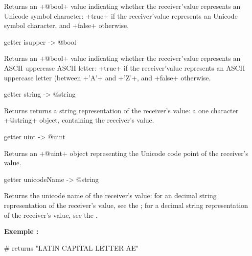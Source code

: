 Returns an \ggs+@bool+ value indicating whether the receiver'value represents an Unicode symbol character: \ggs+true+ if the receiver'value represents an Unicode symbol character, and \ggs+false+ otherwise.










\begin{galgas}
getter isupper -> @bool
\end{galgas}

Returns an \ggs+@bool+ value indicating whether the receiver'value represents an ASCII uppercase ASCII letter: \ggs+true+ if the receiver'value represents an ASCII uppercase letter (between \ggs+'A'+ and \ggs+'Z'+, and \ggs+false+ otherwise.






\begin{galgas}
getter string -> @string
\end{galgas}

Returns returns a string representation of the receiver's value: a one character \ggs+@string+ object, containing the receiver's value.





\begin{galgas}
getter uint -> @uint
\end{galgas}

Returns an \ggs+@uint+ object representing the Unicode code point of the receiver's value.





\begin{galgas}
getter unicodeName -> @string
\end{galgas}

Returns the unicode name of the receiver's value: for an decimal string representation of the receiver's value, see the ; for a decimal string representation of the receiver's value, see the .

\textbf{Exemple :}
\begin{galgas}
['Æ' unicodeName] # returns "LATIN CAPITAL LETTER AE"
\end{galgas}




